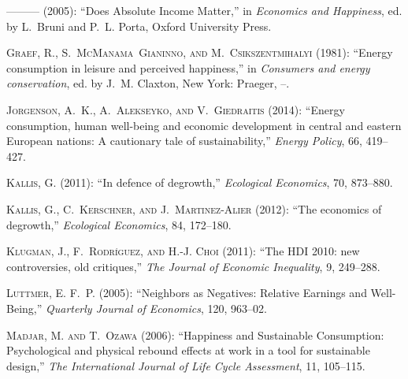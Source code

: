 \documentclass[10pt, letterpaper]{article}
\begin{document}
\begin{spacing}{1.4}
\begin{thebibliography}{36}
---\hspace{-.1pt}---\hspace{-.1pt}--- (2005): \enquote{Does Absolute Income
  Matter,} in \emph{Economics and Happiness}, ed. by L.~Bruni and P.~L. Porta,
  Oxford University Press.

\textsc{Graef, R., S.~McManama~Gianinno, and M.~Csikszentmihalyi} (1981):
  \enquote{Energy consumption in leisure and perceived happiness,} in
  \emph{Consumers and energy conservation}, ed. by J.~M. Claxton, New York:
  Praeger, --.

\textsc{Jorgenson, A.~K., A.~Alekseyko, and V.~Giedraitis} (2014):
  \enquote{Energy consumption, human well-being and economic development in
  central and eastern European nations: A cautionary tale of sustainability,}
  \emph{Energy Policy}, 66, 419--427.

\textsc{Kallis, G.} (2011): \enquote{In defence of degrowth,} \emph{Ecological
  Economics}, 70, 873--880.

\textsc{Kallis, G., C.~Kerschner, and J.~Martinez-Alier} (2012): \enquote{The
  economics of degrowth,} \emph{Ecological Economics}, 84, 172--180.

\textsc{Klugman, J., F.~Rodr{\'\i}guez, and H.-J. Choi} (2011): \enquote{The
  HDI 2010: new controversies, old critiques,} \emph{The Journal of Economic
  Inequality}, 9, 249--288.

\textsc{Luttmer, E. F.~P.} (2005): \enquote{Neighbors as Negatives: Relative
  Earnings and Well-Being,} \emph{Quarterly Journal of Economics}, 120,
  963--02.

\textsc{Madjar, M. and T.~Ozawa} (2006): \enquote{Happiness and Sustainable
  Consumption: Psychological and physical rebound effects at work in a tool for
  sustainable design,} \emph{The International Journal of Life Cycle
  Assessment}, 11, 105--115.


\end{thebibliography}
\end{spacing}
\end{document}

